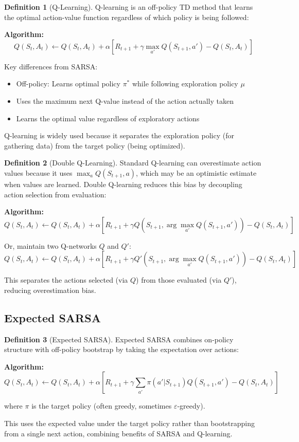 \documentclass[12pt,a4paper]{article}
\theoremstyle{definition}
\newtheorem{definition}{Definition}[section]
\begin{document}
\begin{definition}[Q-Learning]
Q-learning is an off-policy TD method that learns the optimal action-value function regardless of which policy is being followed:

\textbf{Algorithm:}
\[
Q(S_t, A_t) \leftarrow Q(S_t, A_t) + \alpha [R_{t+1} + \gamma \max_{a'} Q(S_{t+1}, a') - Q(S_t, A_t)]
\]

Key differences from SARSA:
\begin{itemize}
    \item Off-policy: Learns optimal policy $\pi^*$ while following exploration policy $\mu$
    \item Uses the maximum next Q-value instead of the action actually taken
    \item Learns the optimal value regardless of exploratory actions
\end{itemize}

Q-learning is widely used because it separates the exploration policy (for gathering data) from the target policy (being optimized).
\end{definition}

\begin{definition}[Double Q-Learning]
Standard Q-learning can overestimate action values because it uses $\max_a Q(S_{t+1}, a)$, which may be an optimistic estimate when values are learned. Double Q-learning reduces this bias by decoupling action selection from evaluation:

\textbf{Algorithm:}
\[
Q(S_t, A_t) \leftarrow Q(S_t, A_t) + \alpha [R_{t+1} + \gamma Q(S_{t+1}, \arg\max_{a'} Q(S_{t+1}, a')) - Q(S_t, A_t)]
\]

Or, maintain two Q-networks $Q$ and $Q'$:
\[
Q(S_t, A_t) \leftarrow Q(S_t, A_t) + \alpha [R_{t+1} + \gamma Q'(S_{t+1}, \arg\max_{a'} Q(S_{t+1}, a')) - Q(S_t, A_t)]
\]

This separates the actions selected (via $Q$) from those evaluated (via $Q'$), reducing overestimation bias.
\end{definition}

\subsection{Expected SARSA}

\begin{definition}[Expected SARSA]
Expected SARSA combines on-policy structure with off-policy bootstrap by taking the expectation over actions:

\textbf{Algorithm:}
\[
Q(S_t, A_t) \leftarrow Q(S_t, A_t) + \alpha \left[ R_{t+1} + \gamma \sum_{a'} \pi(a'|S_{t+1}) Q(S_{t+1}, a') - Q(S_t, A_t) \right]
\]

where $\pi$ is the target policy (often greedy, sometimes $\varepsilon$-greedy).

This uses the expected value under the target policy rather than bootstrapping from a single next action, combining benefits of SARSA and Q-learning.
\end{definition}
\end{document}

